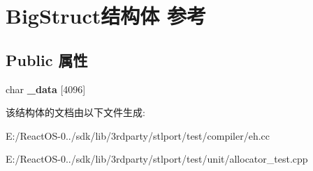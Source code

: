 \hypertarget{struct_big_struct}{}\section{Big\+Struct结构体 参考}
\label{struct_big_struct}
\subsection*{Public 属性}
\begin{DoxyCompactItemize}
\item 
\mbox{\label{struct_big_struct_a56ae57b97962dbb7131977a74adc0065}} 
char {\bfseries \+\_\+data} \mbox{[}4096\mbox{]}
\end{DoxyCompactItemize}


该结构体的文档由以下文件生成\+:\begin{DoxyCompactItemize}
\item 
E\+:/\+React\+O\+S-\/0../sdk/lib/3rdparty/stlport/test/compiler/eh.\+cc\item 
E\+:/\+React\+O\+S-\/0../sdk/lib/3rdparty/stlport/test/unit/allocator\+\_\+test.\+cpp\end{DoxyCompactItemize}

